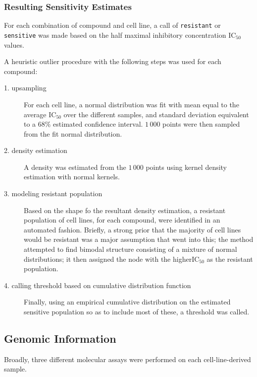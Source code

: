 \subsubsection{Resulting Sensitivity Estimates}

For each combination of compound and cell line, a call of
\texttt{resistant} or \texttt{sensitive} was made based on the
half maximal inhibitory concentration $\text{IC}_{50}$ values.

A heuristic outlier procedure with the following steps was used for
each compound:

\begin{description}
\item[1. upsampling]
  For each cell line, a normal distribution was fit with mean equal to
  the average $\text{IC}_{50}$ over the different samples, and
  standard deviation equivalent to a $68\%$ estimated confidence
  interval. $1\,000$ points were then sampled from the fit normal
  distribution.

  
\item[2. density estimation]
  A density was estimated from the $1\,000$ points using kernel
  density estimation with normal kernels.

  
\item[3. modeling resistant population]
  Based on the shape fo the resultant density estimation, a resistant population of cell lines, for each compound, were
  identified in an automated fashion. Briefly, a strong prior that the
  majority of cell lines would be resistant was a major assumption
  that went into this; the method attempted to find bimodal structure
  consisting of a mixture of normal distributions; it then assigned
  the node with the higher$\text{IC}_{50}$ as the resistant
  population. 

  
\item[4. calling threshold based on cumulative distribution function]
  Finally, using an empirical cumulative distribution on the estimated
  sensitive population so as to include most of these, a threshold was
  called.   
\end{description}



\subsection{Genomic Information}

Broadly, three different molecular assays were performed on each
cell-line-derived sample. 

